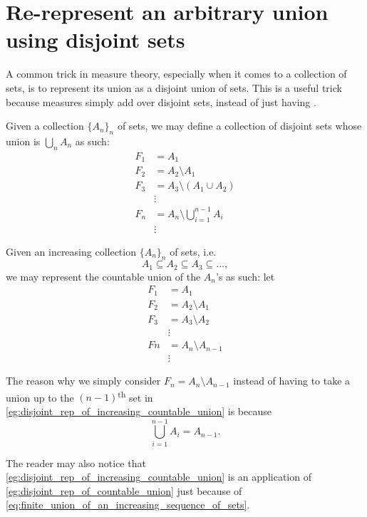 \documentclass[notoc,notitlepage]{tufte-book}
\begin{document}
\section{Re-represent an arbitrary union using disjoint sets}%
\label{sec:re_represent_an_arbitrary_union_using_disjoint_sets}

A common trick in measure theory,
especially when it comes to a collection of sets,
is to represent its union as a disjoint union of sets.
This is a useful trick because measures simply add over disjoint sets,
instead of just having .

\begin{eg}\label{eg:disjoint_rep_of_countable_union}
  Given a collection $\{ A_n \}_{n}$ of sets, we may define a collection of
  disjoint sets whose union is $\bigcup_{n} A_n$ as such:
  \begin{align*}
    F_1 &= A_1 \\
    F_2 &= A_2 \setminus A_1 \\
    F_3 &= A_3 \setminus (A_1 \cup A_2) \\
        &\vdots \\
    F_n &= A_n \setminus \bigcup_{i=1}^{n-1} A_i \\
        &\vdots
  \end{align*}
\end{eg}

\begin{eg}\label{eg:disjoint_rep_of_increasing_countable_union}
  Given an increasing collection $\{ A_n \}_{n}$ of sets, i.e.
  \begin{equation*}
    A_1 \subseteq A_2 \subseteq A_3 \subseteq \hdots,
  \end{equation*}
  we may represent the countable union of the $A_n$'s as such:
  let
  \begin{align*}
    F_1 &= A_1 \\
    F_2 &= A_2 \setminus A_1 \\
    F_3 &= A_3 \setminus A_2 \\
        &\vdots \\
    Fn &= A_n \setminus A_{n-1} \\
       &\vdots
  \end{align*}
\end{eg}

\begin{remark}
  The reason why we simply consider $F_n = A_n \setminus A_{n-1}$ instead
  of having to take a union up to the $(n-1)$\textsuperscript{th}
  set in \cref{eg:disjoint_rep_of_increasing_countable_union}
  is because
  \begin{equation}\label{eq:finite_union_of_an_increasing_sequence_of_sets}
    \bigcup_{i=1}^{n-1} A_i = A_{n-1}.
  \end{equation}

  The reader may also notice that
  \cref{eg:disjoint_rep_of_increasing_countable_union}
  is an application of \cref{eg:disjoint_rep_of_countable_union}
  just because of \cref{eq:finite_union_of_an_increasing_sequence_of_sets}.
\end{remark}


\backmatter

\fancyhead[LE]{\thepage \enspace \textsl{\leftmark}}



\printindex
\end{document}
